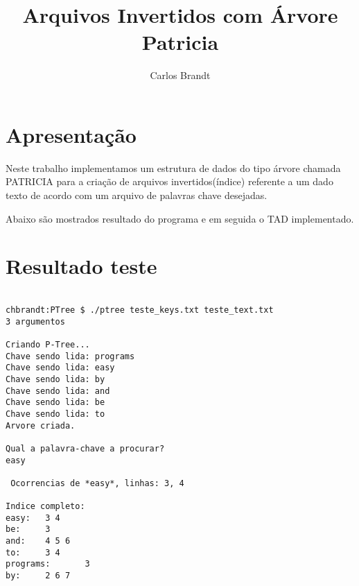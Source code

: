 \documentclass[a4paper,10pt]{article}
\title{Arquivos Invertidos com \'Arvore Patricia}
\author{Carlos Brandt}
\begin{document}
\maketitle

\section*{Apresenta\c c\~ao}
Neste trabalho implementamos um estrutura de dados do tipo \'arvore chamada PATRICIA para a cria\c c\~ao de arquivos invertidos(\'indice) referente a um dado texto de acordo com um arquivo de palavras chave desejadas.

Abaixo s\~ao mostrados resultado do programa e em seguida o TAD implementado.

\section*{Resultado teste}
\begin{verbatim}

chbrandt:PTree $ ./ptree teste_keys.txt teste_text.txt 
3 argumentos

Criando P-Tree...
Chave sendo lida: programs
Chave sendo lida: easy
Chave sendo lida: by
Chave sendo lida: and
Chave sendo lida: be
Chave sendo lida: to
Arvore criada.

Qual a palavra-chave a procurar?
easy

 Ocorrencias de *easy*, linhas: 3, 4

Indice completo:
easy:   3 4 
be:     3 
and:    4 5 6 
to:     3 4 
programs:       3 
by:     2 6 7 

\end{verbatim}
\end{document}

